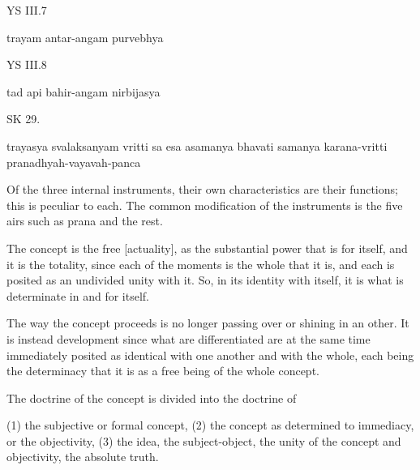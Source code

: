 YS III.7

trayam antar-angam purvebhya

YS III.8

tad api bahir-angam nirbijasya

SK 29.

trayasya svalaksanyam vritti sa esa asamanya bhavati
samanya karana-vritti pranadhyah-vayavah-panca

Of the three internal instruments, their own characteristics are their functions;
this is peculiar to each. The common modification of the instruments is the five airs
such as prana and the rest.

The concept is the free [actuality], as the substantial power that is for itself,
and it is the totality, since each of the moments is the whole that it is,
and each is posited as an undivided unity with it.
So, in its identity with itself, it is what is determinate in and for itself.

The way the concept proceeds is no longer passing over or shining in an other.
It is instead development since what are differentiated are at the same time
immediately posited as identical with one another and with the whole,
each being the determinacy that it is as a free being of the whole concept.

The doctrine of the concept is divided into the doctrine of

(1) the subjective or formal concept,
(2) the concept as determined to immediacy, or the objectivity,
(3) the idea, the subject-object, the unity of the concept and objectivity,
    the absolute truth.

